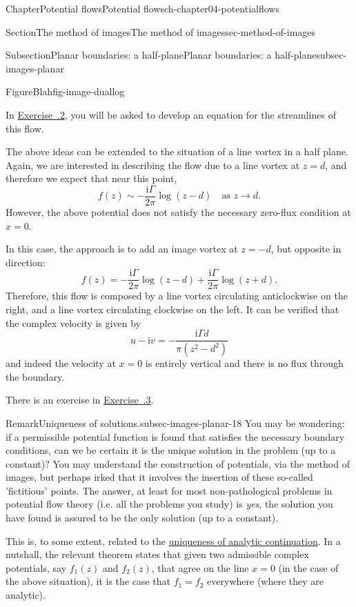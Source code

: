 \documentclass[oneside,10pt,]{book}
\newcommand{\xreffont}{\relax}
\numberwithin{equation}{section}
\newcommand{\im}{\mathrm{i}}
\begin{document}
\begin{chapterptx}{Chapter}{Potential flows}{}{Potential flows}{}{}{ch-chapter04-potentialflows}
\begin{sectionptx}{Section}{The method of images}{}{The method of images}{}{}{sec-method-of-images}
\begin{subsectionptx}{Subsection}{Planar boundaries: a half-plane}{}{Planar boundaries: a half-plane}{}{}{subsec-images-planar}
\begin{figureptx}{Figure}{Blah}{fig-image-duallog}{}
\begin{image}{0}{1}{0}{}
\end{image}%
\tcblower
\end{figureptx}%
In \hyperlink{ps-image-planar02}{Exercise~{\xreffont 4.6.2}}, you will be asked to develop an equation for the streamlines of this flow.%
\par
The above ideas can be extended to the situation of a line vortex in a half plane. Again, we are interested in describing the flow due to a line vortex at \(z = d\), and therefore we expect that near this point,%
\begin{equation*}
f(z) \sim -\frac{\im\Gamma}{2\pi} \log(z - d) \quad \textrm{as $z \to d$}.
\end{equation*}
However, the above potential does not satisfy the necessary zero-flux condition at \(x = 0\).%
\par
In this case, the approach is to add an image vortex at \(z = -d\), but opposite in direction:%
\begin{equation*}
f(z) = -\frac{\im\Gamma}{2\pi} \log(z - d) + \frac{\im\Gamma}{2\pi} \log(z + d).
\end{equation*}
Therefore, this flow is composed by a line vortex circulating anticlockwise on the right, and a line vortex circulating clockwise on the left. It can be verified that the complex velocity is given by%
\begin{equation*}
u - \im v = -\frac{\im \Gamma d}{\pi(z^2 - d^2)}
\end{equation*}
and indeed the velocity at \(x = 0\) is entirely vertical and there is no flux through the boundary.%
\par
There is an exercise in \hyperlink{ps-image-planar03}{Exercise~{\xreffont 4.6.3}}.%
\begin{remark}{Remark}{Uniqueness of solutions.}{subsec-images-planar-18}%
You may be wondering: if a permissible potential function is found that satisfies the necessary boundary conditions, can we be certain it is the unique solution in the problem (up to a constant)? You may understand the construction of potentials, via the method of images, but perhaps irked that it involves the insertion of these so-called 'fictitious' points. The answer, at least for most non-pathological problems in potential flow theory (i.e. all the problems you study) is \emph{yes}, the solution you have found is assured to be the only solution (up to a constant).%
\par
This is, to some extent, related to the \href{https://proofwiki.org/wiki/Uniqueness_of_Analytic_Continuation}{uniqueness of analytic continuation}. In a nutshall, the relevant theorem states that given two admissible complex potentials, say \(f_1(z)\) and \(f_2(z)\), that agree on the line \(x = 0\) (in the case of the above situation), it is the case that \(f_1 = f_2\) everywhere (where they are analytic).%

\end{remark}
\end{subsectionptx}
\end{sectionptx}
\end{chapterptx}
\end{document}
